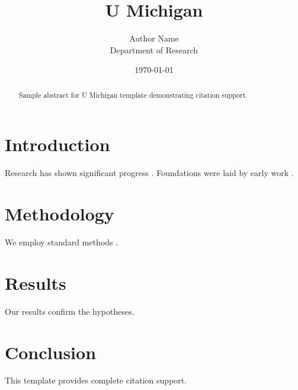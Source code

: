 \documentclass{thesis_michigan}
\title{U Michigan}
\author{Author Name \\ \small Department of Research}
\date{\today}
\begin{document}
\maketitle

\begin{abstract}
Sample abstract for U Michigan template demonstrating citation support.
\end{abstract}

\section{Introduction}
Research has shown significant progress \citep{einstein1905}. Foundations were laid by early work \citep{turing1950}.

\section{Methodology}
We employ standard methods \citep{knuth1984}.

\section{Results}
Our results confirm the hypotheses.

\section{Conclusion}
This template provides complete citation support.



\end{document}
